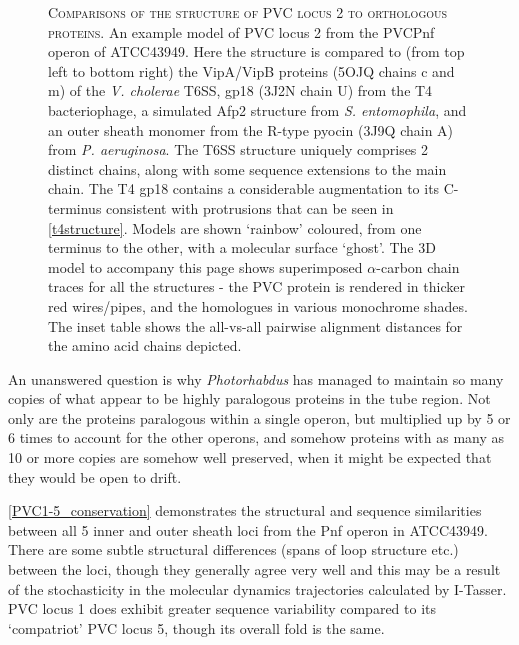 \begin{figure}[p]
\begin{subfigure}[H]{\textwidth}
\begin{tabularx}{1.01\textwidth}{CCCCCCC}
\end{tabularx}
\end{subfigure}  
 \captionsetup{singlelinecheck=off, justification=justified, font=footnotesize, aboveskip=20pt}
 \caption[PVC2 homolog comparisons]{\textsc{\normalsize Comparisons of the structure of PVC locus 2 to orthologous proteins.}\vspace{0.1cm} \newline An example model of PVC locus 2 from the PVCPnf operon of \Pasy{} ATCC43949. Here the structure is compared to (from top left to bottom right) the VipA/VipB proteins (5OJQ chains c and m) of the \emph{V. cholerae} T6SS, gp18 (3J2N chain U) from the T4 bacteriophage, a simulated Afp2 structure from \emph{S. entomophila}, and an outer sheath monomer from the R-type pyocin (3J9Q chain A) from \emph{P. aeruginosa}. The T6SS structure uniquely comprises 2 distinct chains, along with some sequence extensions to the main chain. The T4 gp18 contains a considerable augmentation to its C-terminus consistent with protrusions that can be seen in \vref{t4structure}. Models are shown `rainbow' coloured, from one terminus to the other, with a molecular surface `ghost'. The 3D model to accompany this page shows superimposed $\alpha$-carbon chain traces for all the structures - the PVC protein is rendered in thicker red wires/pipes, and the homologues in various monochrome shades. The inset table shows the all-vs-all pairwise alignment distances for the amino acid chains depicted.}
	\label{PVC2comparisons}
\end{figure}


\label{duptrip}
An unanswered question is why \emph{Photorhabdus} has managed to maintain so many copies of what appear to be highly paralogous proteins in the tube region. Not only are the proteins paralogous within a single operon, but multiplied up by 5 or 6 times to account for the other operons, and somehow proteins with as many as 10 or more copies are somehow well preserved, when it might be expected that they would be open to drift.

\vref{PVC1-5_conservation} demonstrates the structural and sequence similarities between all 5 inner and outer sheath loci from the Pnf operon in \Pasy{} ATCC43949. There are some subtle structural differences (spans of loop structure etc.) between the loci, though they generally agree very well and this may be a result of the stochasticity in the molecular dynamics trajectories calculated by I-Tasser. PVC locus 1 does exhibit greater sequence variability compared to its `compatriot' PVC locus 5, though its overall fold is the same.

